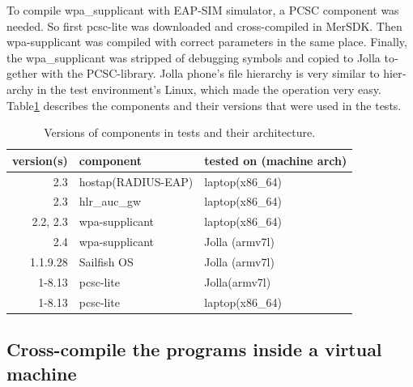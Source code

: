 \documentclass[12pt,a4paper,english]{tutthesis}
\begin{document}
\begin{otherlanguage}{english}
To compile wpa\_supplicant with EAP-SIM simulator, a PCSC component was
needed. So first pcsc-lite was downloaded and cross-compiled in
MerSDK. Then wpa-supplicant was compiled with correct parameters in
the same place. Finally, the wpa\_supplicant was stripped of debugging
symbols and copied to Jolla together with the PCSC-library.  Jolla
phone's file hierarchy is very similar to hierarchy in the test
environment's Linux, which made the operation very easy.
Table\ref{version-table} describes the components and their versions that were used in the tests.

\begin{table}[htb]
\caption{\label{version-table}Versions of components in tests and their architecture.}
\centering
\begin{tabular}{rll}
version(s) & component & tested on (machine arch)\\
\hline
2.3 & hostap(RADIUS-EAP) & laptop(x86\_64)\\
2.3 & hlr\_auc\_gw & laptop(x86\_64)\\
2.2, 2.3 & wpa-supplicant & laptop(x86\_64)\\
2.4 & wpa-supplicant & Jolla (armv7l)\\
1.1.9.28 & Sailfish OS & Jolla (armv7l)\\
1-8.13 & pcsc-lite & Jolla(armv7l)\\
1-8.13 & pcsc-lite & laptop(x86\_64)\\
\hline
\end{tabular}
\end{table}

\subsection{Cross-compile the programs inside a virtual machine}
\label{sec-5-3-1}


\end{otherlanguage}
\end{document}
